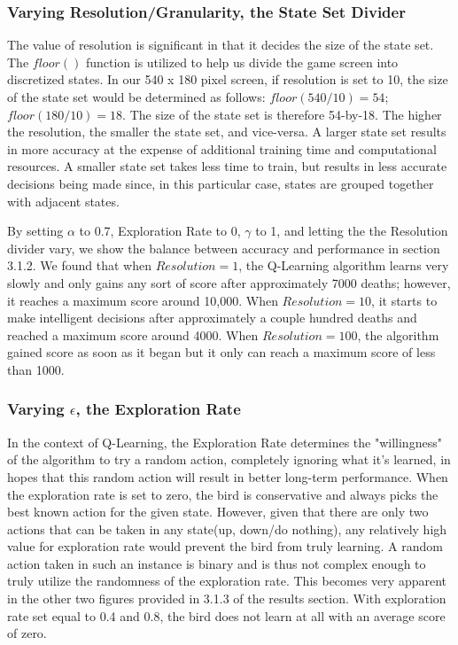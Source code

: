 \documentclass[a4paper, 12pt]{article}
\begin{document}
\subsubsection{Varying Resolution/Granularity, the State Set Divider}

The value of resolution is significant in that it decides the size of the state set. The $floor()$ function is utilized to help us divide the game screen into discretized states. In our 540 x 180 pixel screen, if resolution is set to 10, the size of the state set would be determined as follows: $floor(540 / 10) = 54$; $floor(180/10) = 18$. The size of the state set is therefore 54-by-18. The higher the resolution, the smaller the state set, and vice-versa. A larger state set results in more accuracy at the expense of additional training time and computational resources. A smaller state set takes less time to train, but results in less accurate decisions being made since, in this particular case, states are grouped together with adjacent states.

By setting $\alpha$ to 0.7, Exploration Rate to 0, $\gamma$ to 1, and letting the the Resolution divider vary, we show the balance between accuracy and performance in section 3.1.2. We found that when $Resolution = 1$, the Q-Learning algorithm learns very slowly and only gains any sort of score after approximately 7000 deaths; however, it reaches a maximum score around 10,000. When $Resolution = 10$, it starts to make intelligent decisions after approximately a couple hundred deaths and reached a maximum score around 4000. When $Resolution = 100$, the algorithm gained score as soon as it began but it only can reach a maximum score of less than 1000.

\subsubsection{Varying $\epsilon$, the Exploration Rate}


In the context of Q-Learning, the Exploration Rate determines the "willingness" of the algorithm to try a random action, completely ignoring what it's learned, in hopes that this random action will result in better long-term performance. When the exploration rate is set to zero, the bird is conservative and always picks the best known action for the given state. However, given that there are only two actions that can be taken in any state(up, down/do nothing), any relatively high value for exploration rate would prevent the bird from truly learning. A random action taken in such an instance is binary and is thus not complex enough to truly utilize the randomness of the exploration rate. This becomes very apparent in the other two figures provided in 3.1.3 of the results section. With exploration rate set equal to 0.4 and 0.8, the bird does not learn at all with an average score of zero.
\end{document}
